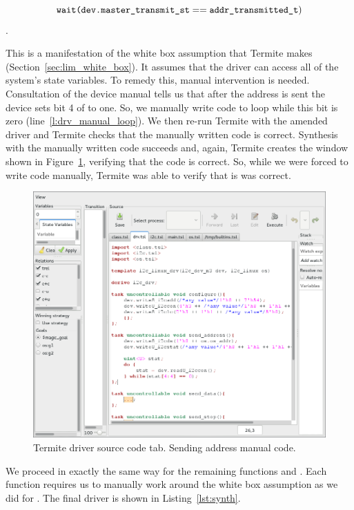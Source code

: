 $$\texttt{wait(dev.master\_transmit\_st} == \texttt{addr\_transmitted\_t})$$.

This is a manifestation of the white box assumption that Termite makes (Section~\ref{sec:lim_white_box}). It assumes that the driver can access all of the system's state variables. To remedy this, manual intervention is needed. Consultation of the device manual tells us that after the address is sent the device sets bit 4 of  to one. So, we manually write code to loop while this bit is zero (line~\ref{l:drv_manual_loop}). We then re-run Termite with the amended driver and Termite checks that the manually written code is correct. Synthesis with the manually written code succeeds and, again, Termite creates the window shown in Figure~\ref{fig:driver_tab_addr_man}, verifying that the code is correct. So, while we were forced to write code manually, Termite was able to verify that is was correct.

\begin{figure}
    \center
    \includegraphics[width=\linewidth]{imgs/screenshot_4.png}
    \caption{Termite driver source code tab. Sending address manual code.}
    \label{fig:driver_tab_addr_man}
\end{figure}

We proceed in exactly the same way for the remaining functions  and . Each function requires us to manually work around the white box assumption as we did for . The final driver is shown in Listing~\ref{lst:synth}.

